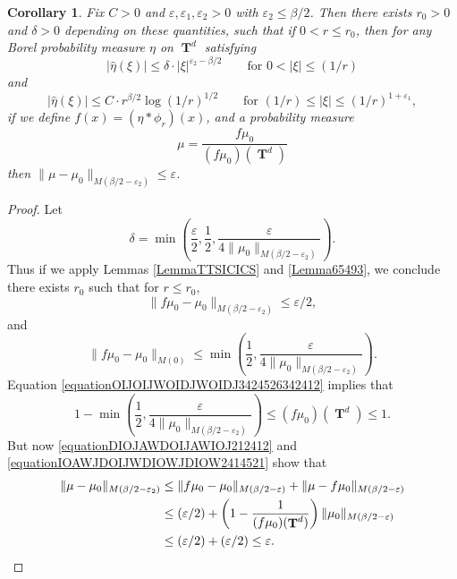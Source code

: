 \documentclass[12pt,reqno]{article}
\numberwithin{equation}{section}
\DeclareMathOperator{\TT}{\mathbf{T}}
\newtheorem{corollary}[theorem]{Corollary}
\numberwithin{theorem}{section}
\begin{document}
\begin{corollary} \label{lemmaIOJDD23124}
    Fix $C > 0$ and $\varepsilon,\varepsilon_1,\varepsilon_2 > 0$ with $\varepsilon_2 \leq \beta/2$. Then there exists $r_0 > 0$ and $\delta > 0$ depending on these quantities, such that if $0 < r \leq r_0$, then for any Borel probability measure $\eta$ on $\TT^d$ satisfying
    \begin{equation} \label{equationADOIJWAOIDJAD}
        \left| \widehat{\eta}(\xi) \right| \leq \delta \cdot |\xi|^{\varepsilon_2-\beta/2}\quad\quad\text{for $0 < |\xi| \leq (1/r)$}
    \end{equation}
    and
    \begin{equation} \label{equationIAOIDJAOICJOIBJOIEVJ2}
        \left| \widehat{\eta}(\xi) \right| \leq C \cdot r^{\beta/2} \log(1/r)^{1/2} \quad\quad\text{for $(1/r) \leq |\xi| \leq (1/r)^{1 + \varepsilon_1}$},
    \end{equation}
    if we define $f(x) = (\eta * \phi_r)(x)$, and a probability measure
    \[ \mu = \frac{f \mu_0}{(f \mu_0)(\TT^d)} \]
    then $\| \mu - \mu_0 \|_{M(\beta/2-\varepsilon_2)} \leq \varepsilon$.
\end{corollary}
\begin{proof}
    Let
    \[ \delta = \min \left( \frac{\varepsilon}{2}, \frac{1}{2}, \frac{\varepsilon}{4 \| \mu_0 \|_{M(\beta/2-\varepsilon_2)}} \right). \]
    Thus if we apply Lemmas \ref{LemmaTTSICICS} and \ref{Lemma65493}, we conclude there exists $r_0$ such that for $r \leq r_0$,
    \begin{equation} \label{equationDIOJAWDOIJAWIOJ212412}
        \| f \mu_0 - \mu_0 \|_{M(\beta/2 - \varepsilon_2)} \leq \varepsilon/2,
    \end{equation}
    and
    \begin{equation} \label{equationOIJOIJWOIDJWOIDJ3424526342412}
        \| f \mu_0 - \mu_0 \|_{M(0)} \leq \min \left( \frac{1}{2}, \frac{\varepsilon}{4 \| \mu_0 \|_{M(\beta/2 - \varepsilon_2)}} \right).
    \end{equation}
    Equation \eqref{equationOIJOIJWOIDJWOIDJ3424526342412} implies that
    \begin{equation} \label{equationIOAWJDOIJWDIOWJDIOW2414521}
        1 - \min \left( \frac{1}{2}, \frac{\varepsilon}{4 \| \mu_0 \|_{M(\beta/2 - \varepsilon_2)}} \right) \leq (f\mu_0)(\TT^d) \leq 1.
    \end{equation}
    But now \eqref{equationDIOJAWDOIJAWIOJ212412} and \eqref{equationIOAWJDOIJWDIOWJDIOW2414521} show that
    \begin{align*}
        \| \mu - \mu_0 \|_{M(\beta/2 - \varepsilon_2)} &\leq \| f \mu_0 - \mu_0 \|_{M(\beta/2 - \varepsilon)} + \| \mu - f \mu_0 \|_{M(\beta/2 - \varepsilon)}\\
        &\leq (\varepsilon/2) + \left( 1 - \frac{1}{(f \mu_0)(\TT^d)} \right) \| \mu_0 \|_{M(\beta/2 - \varepsilon)}\\
        &\leq (\varepsilon/2) + (\varepsilon/2) \leq \varepsilon. \qedhere
    \end{align*}
\end{proof}
\end{document}
